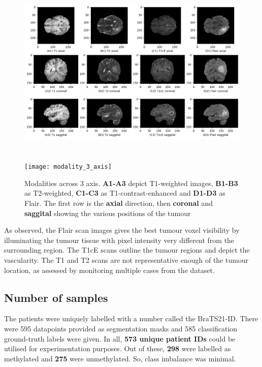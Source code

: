 \begin{figure}[H]
  \begin{center}
    \leavevmode
    \ifpdf
      \includegraphics[height=3.6in, width=5.7in]{Experimental/Chapter2Figs/modality_3_axis.jpeg}
    \else
      \texttt{[image: modality\_3\_axis]}
    \fi
    \caption{Modalities across 3 axis. \textbf{A1-A3} depict T1-weighted images, \textbf{B1-B3} as T2-weighted, \textbf{C1-C3} as T1-contrast-enhanced and \textbf{D1-D3} as Flair. The first row is the \textbf{axial} direction, then \textbf{coronal} and \textbf{saggital} showing the various positions of the tumour}
    \label{modality_3_axis}
  \end{center}
\end{figure}


As observed, the Flair scan images gives the best tumour voxel visibility by illuminating the tumour tissue with pixel intensity very different from the surrounding region. The T1cE scans outline the tumour regions and depict the vascularity. The T1 and T2 scans are not representative enough of the tumour location, as assessed by monitoring multiple cases from the dataset.

\subsection{Number of samples}
\vspace*{3mm}
The patients were uniquely labelled with a number called the BraTS21-ID. There were 595 datapoints provided as segmentation masks and 585 classification ground-truth labels were given. In all, \textbf{573 unique patient IDs} could be utilised for experimentation purposes. Out of these, \textbf{298} were labelled as methylated and \textbf{275} were unmethylated. So, class imbalance was minimal.
\vspace*{3mm}

